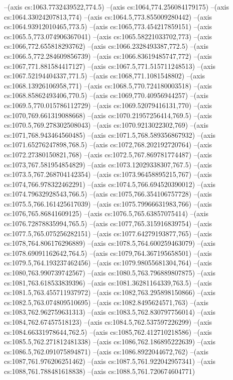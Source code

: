 --(axis cs:1063.7732439522,774.5)
--(axis cs:1064,774.256084179175)
--(axis cs:1064.33024207813,774)
--(axis cs:1064.5,773.855009280442)
--(axis cs:1064.93912010465,773.5)
--(axis cs:1065,773.454217859151)
--(axis cs:1065.5,773.074906367041)
--(axis cs:1065.58221033702,773)
--(axis cs:1066,772.655818293762)
--(axis cs:1066.2328493387,772.5)
--(axis cs:1066.5,772.284609856739)
--(axis cs:1066.83619485747,772)
--(axis cs:1067,771.881584417127)
--(axis cs:1067.5,771.515711248513)
--(axis cs:1067.52194404337,771.5)
--(axis cs:1068,771.1081548802)
--(axis cs:1068.13926106958,771)
--(axis cs:1068.5,770.724180003518)
--(axis cs:1068.85862493406,770.5)
--(axis cs:1069,770.40956944257)
--(axis cs:1069.5,770.015786112729)
--(axis cs:1069.52079416131,770)
--(axis cs:1070,769.661319088668)
--(axis cs:1070.21957256414,769.5)
--(axis cs:1070.5,769.278302508043)
--(axis cs:1070.9213022302,769)
--(axis cs:1071,768.943464560485)
--(axis cs:1071.5,768.589356867932)
--(axis cs:1071.65276247898,768.5)
--(axis cs:1072,768.202192720764)
--(axis cs:1072.27380150821,768)
--(axis cs:1072.5,767.869781774487)
--(axis cs:1073,767.581954854829)
--(axis cs:1073.12029338307,767.5)
--(axis cs:1073.5,767.268704142354)
--(axis cs:1073.96458895215,767)
--(axis cs:1074,766.978322462291)
--(axis cs:1074.5,766.694520390012)
--(axis cs:1074.79632928543,766.5)
--(axis cs:1075,766.354106757728)
--(axis cs:1075.5,766.161425617039)
--(axis cs:1075.79966631983,766)
--(axis cs:1076,765.86841609125)
--(axis cs:1076.5,765.63857075414)
--(axis cs:1076.72878835994,765.5)
--(axis cs:1077,765.315916839754)
--(axis cs:1077.5,765.075256282151)
--(axis cs:1077.64279193877,765)
--(axis cs:1078,764.806176296889)
--(axis cs:1078.5,764.600259463079)
--(axis cs:1078.69091162642,764.5)
--(axis cs:1079,764.367195658501)
--(axis cs:1079.5,764.193237462456)
--(axis cs:1079.98055681304,764)
--(axis cs:1080,763.990739742567)
--(axis cs:1080.5,763.796889807875)
--(axis cs:1081,763.618533839396)
--(axis cs:1081.36281164339,763.5)
--(axis cs:1081.5,763.455711937972)
--(axis cs:1082,763.295898150866)
--(axis cs:1082.5,763.074809510695)
--(axis cs:1082.8495624571,763)
--(axis cs:1083,762.962759631313)
--(axis cs:1083.5,762.830797756014)
--(axis cs:1084,762.67457518123)
--(axis cs:1084.5,762.537597226299)
--(axis cs:1084.66331978644,762.5)
--(axis cs:1085,762.412710218586)
--(axis cs:1085.5,762.271812481338)
--(axis cs:1086,762.186895222639)
--(axis cs:1086.5,762.091075894871)
--(axis cs:1086.8922044672,762)
--(axis cs:1087,761.976206251462)
--(axis cs:1087.5,761.922042957341)
--(axis cs:1088,761.788481618838)
--(axis cs:1088.5,761.720674604771)
